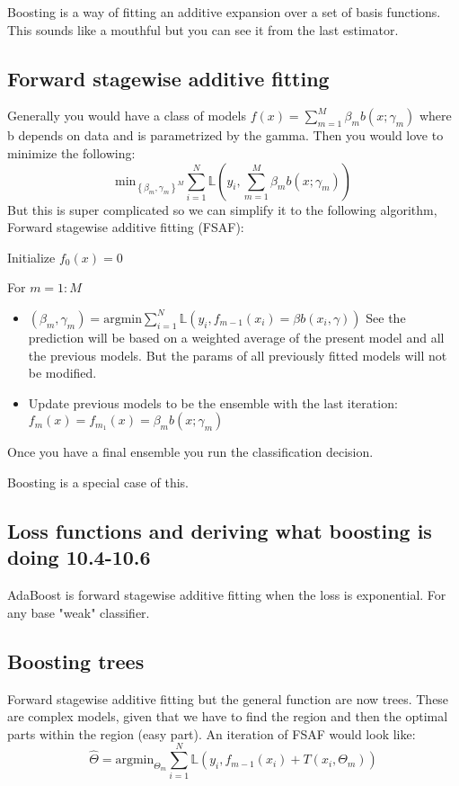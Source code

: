 \documentclass{article}
\begin{document}
Boosting is a way of fitting an additive expansion over a set of basis functions. This sounds like a mouthful but you can see it from the last estimator. 

\subsection{Forward stagewise additive fitting}
Generally you would have a class of models $f(x) = \sum_{m = 1}^{M} \beta_m b(x;\gamma_m)$ where b depends on data and is parametrized by the gamma.
Then you would love to minimize the following:
$$\text{min}_{\left\{\beta_m, \gamma_m\right\}^M } \sum_{i = 1}^{N} \mathbb{L} (y_i, \sum_{m = 1}^{M} \beta_m b(x;\gamma_m))  $$
But this is super complicated so we can simplify it to the following algorithm, Forward stagewise additive fitting (FSAF):

Initialize $f_0(x) = 0$

For $m = 1:M$
\begin{itemize}
    \item $(\beta_m,\gamma_m) = \text{argmin}\sum_{i = 1}^{N}  \mathbb{L}(y_i, f_{m-1}(x_i) = \beta b(x_i,\gamma)) $ See the prediction will be based on a 
    weighted average of the present model and all the previous models. But the params of all previously fitted models will not be modified.
    \item Update previous models to be the ensemble with the last iteration: $f_m(x) = f_{m_1}(x) = \beta_m b(x;\gamma_m)$
\end{itemize}
Once you have a final ensemble you run the classification decision.


Boosting is a special case of this.

\subsection{Loss functions and deriving what boosting is doing 10.4-10.6}

AdaBoost is forward stagewise additive fitting when the loss is exponential. For any base "weak" classifier.

\subsection{Boosting trees}
Forward stagewise additive fitting but the general function are now trees. These are complex models, given that we have to find the region and
then the optimal parts within the region (easy part).
An iteration of FSAF would look like: $$\hat{\Theta} = \text{argmin}_{\Theta_m} \sum_{i=1}^{N}\mathbb{L} (y_i,f_{m-1}(x_i) + T(x_i, \Theta_m))$$
\end{document}
